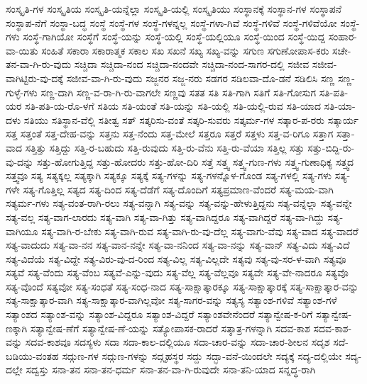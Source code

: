 {ಸಂಸ್ಕೃತಿ-ಗಳ
ಸಂಸ್ಕೃತಿಯ
ಸಂಸ್ಕೃತಿ-ಯನ್ನೆಲ್ಲಾ
ಸಂಸ್ಕೃತಿ-ಯಲ್ಲಿ
ಸಂಸ್ಕೃತಿಯು
ಸಂಸ್ಥಾನಕ್ಕೆ
ಸಂಸ್ಥಾನ-ಗಳ
ಸಂಸ್ಥಾಪನೆ
ಸಂಸ್ಥಾಪ-ನೆಗೆ
ಸಂಸ್ಥಾ-ಬದ್ಧ
ಸಂಸ್ಥೆ
ಸಂಸ್ಥೆ-ಗಳ
ಸಂಸ್ಥೆ-ಗಳನ್ನಲ್ಲ
ಸಂಸ್ಥೆ-ಗಳಾ-ಗಿವೆ
ಸಂಸ್ಥೆ-ಗಳಿವೆ
ಸಂಸ್ಥೆ-ಗಳಿವೆಯೋ
ಸಂಸ್ಥೆ-ಗಳು
ಸಂಸ್ಥೆ-ಗಾಗಿಯೋ
ಸಂಸ್ಥೆಗೆ
ಸಂಸ್ಥೆ-ಯನ್ನು
ಸಂಸ್ಥೆ-ಯಲ್ಲಿ
ಸಂಸ್ಥೆ-ಯಲ್ಲಿಯೂ
ಸಂಸ್ಥೆ-ಯಿಂದ
ಸಂಸ್ಥೆ-ಯಿದ್ದ
ಸಂಹಾರ-ವಾ-ಯಿತು
ಸಂಹಿತೆ
ಸಕಾರಾ
ಸಕಾರಾತ್ಮಕ
ಸಕಾಲ
ಸಖ
ಸಖನೆ
ಸಖ್ಯ
ಸಖ್ಯ-ವನ್ನು
ಸಗುಣ
ಸಗುಣೋಪಾಸ-ಕರು
ಸಚೇ-ತನ-ವಾ-ಗಿ-ರು-ವುದು
ಸಚ್ಚಿದಾ
ಸಚ್ಚಿದಾ-ನಂದ
ಸಚ್ಚಿದಾ-ನಂದವೇ
ಸಚ್ಚಿದಾ-ನಂದ-ಸಾಗರ-ದಲ್ಲಿ
ಸಜೀವ
ಸಜೀವ-ವಾಗಿಟ್ಟಿರು-ವು-ದಕ್ಕೆ
ಸಜೀವ-ವಾ-ಗಿ-ರು-ವುದು
ಸಜ್ಜನರ
ಸಜ್ಜ-ನರು
ಸಡಗರ
ಸಡಿಲವಾ-ದೊ-ಡನೆ
ಸಡಿಲಿಸಿ
ಸಣ್ಣ
ಸಣ್ಣ-ಗುಳ್ಳೆ-ಗಳು
ಸಣ್ಣ-ದಾಗಿ
ಸಣ್ಣ-ವ-ರಾ-ಗಿ-ರು-ವಾಗಲೇ
ಸಣ್ಣವು
ಸತತ
ಸತಿ
ಸತಿ-ಗಾಗಿ
ಸತಿಗೆ
ಸತಿ-ಗೋಸುಗ
ಸತಿ-ಪತಿ-ಯರ
ಸತಿ-ಪತಿ-ಯ-ರೊ-ಳಗೆ
ಸತಿಯ
ಸತಿ-ಯಂತೆ
ಸತಿ-ಯನ್ನು
ಸತಿ-ಯಲ್ಲಿ
ಸತಿ-ಯಲ್ಲಿ-ರುವ
ಸತಿ-ಯಾದ
ಸತಿ-ಯಾ-ದಳು
ಸತಿಯು
ಸತಿಸ್ಥಾನ-ವೆಲ್ಲಿ
ಸತೀತ್ವ
ಸತ್
ಸತ್ಕರಿಸು-ವಂತೆ
ಸತ್ಕರಿ-ಸುವರು
ಸತ್ಕರ್ಮ-ಗಳ
ಸತ್ಕಾರ-ಪ-ರರು
ಸತ್ಕಾರ್ಯ
ಸತ್ತ
ಸತ್ತಂತೆ
ಸತ್ತ-ದೇಹ-ವನ್ನು
ಸತ್ತನು
ಸತ್ತ-ನೆಂದು
ಸತ್ತ-ಮೇಲೆ
ಸತ್ತರೂ
ಸತ್ತರೆ
ಸತ್ತಳು
ಸತ್ತ-ವ-ರಿಗೂ
ಸತ್ತಾಗ
ಸತ್ತಾ-ವಾದ
ಸತ್ತಿತ್ತು
ಸತ್ತಿದ್ದು
ಸತ್ತಿ-ರ-ಬಹುದು
ಸತ್ತಿ-ರುವುದು
ಸತ್ತಿ-ರು-ವೆನು
ಸತ್ತಿ-ರು-ವೆಯಾ
ಸತ್ತಿಲ್ಲ
ಸತ್ತು
ಸತ್ತು-ಬಿದ್ದಿ-ರು-ವು-ದನ್ನು
ಸತ್ತು-ಹೋಗುತ್ತಿದ್ದ
ಸತ್ತು-ಹೋದರು
ಸತ್ತು-ಹೋ-ದಿರಿ
ಸತ್ತೆ
ಸತ್ತ್ವ
ಸತ್ತ್ವ-ಗುಣ-ಗಳು
ಸತ್ತ್ವ-ಗುಣಾಧಿಕ್ಯ
ಸತ್ತ್ವದ
ಸತ್ತ್ವವೂ
ಸತ್ಯ
ಸತ್ಯಕ್ಕಲ್ಲ
ಸತ್ಯಕ್ಕಾಗಿ
ಸತ್ಯಕ್ಕೂ
ಸತ್ಯಕ್ಕೆ
ಸತ್ಯ-ಗಳನ್ನು
ಸತ್ಯ-ಗಳನ್ನೊಳ-ಗೊಂಡ
ಸತ್ಯ-ಗಳಲ್ಲಿ
ಸತ್ಯ-ಗಳು
ಸತ್ಯ-ಗಳೇ
ಸತ್ಯ-ಗೊತ್ತಿಲ್ಲ
ಸತ್ಯದ
ಸತ್ಯ-ದಿಂದ
ಸತ್ಯ-ದೆಡೆಗೆ
ಸತ್ಯ-ದೊಂದಿಗೆ
ಸತ್ಯಪ್ರಮಾಣ-ವೆಂದರೆ
ಸತ್ಯ-ಮಯ-ವಾಗಿ
ಸತ್ಯರ್ಮ-ಗಳು
ಸತ್ಯ-ವಂತ-ರಾಗಿ-ರಲು
ಸತ್ಯ-ವನ್ನಾಗಿ
ಸತ್ಯ-ವನ್ನು
ಸತ್ಯ-ವನ್ನು-ಹೇಳುತ್ತಿದ್ದನು
ಸತ್ಯ-ವನ್ನೆಲ್ಲಾ
ಸತ್ಯ-ವನ್ನೇ
ಸತ್ಯ-ವಲ್ಲ
ಸತ್ಯ-ವಾಗ-ಲಾರದು
ಸತ್ಯ-ವಾಗಿ
ಸತ್ಯ-ವಾ-ಗಿತ್ತು
ಸತ್ಯ-ವಾಗಿದ್ದರೂ
ಸತ್ಯ-ವಾಗಿದ್ದರೆ
ಸತ್ಯ-ವಾ-ಗಿದ್ದು
ಸತ್ಯ-ವಾಗಿಯೂ
ಸತ್ಯ-ವಾಗಿ-ರ-ಬೇಕು
ಸತ್ಯ-ವಾಗಿ-ರುವ
ಸತ್ಯ-ವಾಗಿ-ರು-ವು-ದೆಲ್ಲ
ಸತ್ಯ-ವಾಗು-ವೆವು
ಸತ್ಯ-ವಾದ
ಸತ್ಯ-ವಾದರೆ
ಸತ್ಯ-ವಾದುದು
ಸತ್ಯ-ವಾ-ನನ
ಸತ್ಯ-ವಾನ-ನನ್ನೇ
ಸತ್ಯ-ವಾ-ನನಿಂದ
ಸತ್ಯ-ವಾ-ನನ್ನು
ಸತ್ಯ-ವಾನ್
ಸತ್ಯ-ವಿದು
ಸತ್ಯ-ವಿದೆ
ಸತ್ಯ-ವಿದೆಯೆ
ಸತ್ಯ-ವಿದ್ದೇ
ಸತ್ಯ-ವಿರು-ವು-ದ-ರಿಂದ
ಸತ್ಯ-ವಿಲ್ಲ
ಸತ್ಯ-ವಿಲ್ಲದೇ
ಸತ್ಯವು
ಸತ್ಯ-ವು-ಸರ-ಳ-ವಾಗಿ
ಸತ್ಯವೂ
ಸತ್ಯವೆ
ಸತ್ಯ-ವೆಂದು
ಸತ್ಯ-ವೆಂಬ
ಸತ್ಯವೆ-ಎನ್ನು-ವುದು
ಸತ್ಯ-ವೆಲ್ಲ
ಸತ್ಯ-ವೆಲ್ಲವೂ
ಸತ್ಯವೇ
ಸತ್ಯ-ವೇ-ನಾದರೂ
ಸತ್ಯವೊ
ಸತ್ಯ-ವೊಂದೆ
ಸತ್ಯವೋ
ಸತ್ಯ-ಸಂಧತೆ
ಸತ್ಯ-ಸಂಧ-ನಾದ
ಸತ್ಯ-ಸಾಕ್ಷಾತ್ಕಾರಕ್ಕೂ
ಸತ್ಯ-ಸಾಕ್ಷಾತ್ಕಾರಕ್ಕೆ
ಸತ್ಯ-ಸಾಕ್ಷಾತ್ಕಾರ-ವನ್ನು
ಸತ್ಯ-ಸಾಕ್ಷಾತ್ಕಾರ-ವಾಗಿ
ಸತ್ಯ-ಸಾಕ್ಷಾತ್ಕಾರ-ವಾಗಿಲ್ಲವೋ
ಸತ್ಯ-ಸಾಗರ-ವನ್ನು
ಸತ್ಯಸ್ಯ
ಸತ್ಯಾಂಶ-ಗಳಿವೆ
ಸತ್ಯಾಂಶ-ಗಳೆ
ಸತ್ಯಾಂಶದ
ಸತ್ಯಾಂಶ-ವನ್ನು
ಸತ್ಯಾಂಶ-ವಿದ್ದರೂ
ಸತ್ಯಾಂಶ-ವಿದ್ದರೆ
ಸತ್ಯಾಂಶವೇನೆಂದರೆ
ಸತ್ಯಾನ್ವೇಷ-ಕ-ರಿಗೆ
ಸತ್ಯಾನ್ವೇಷ-ಣಕ್ಕಾಗಿ
ಸತ್ಯಾನ್ವೇಷ-ಣೆಗೆ
ಸತ್ಯಾನ್ವೇಷ-ಣೆ-ಯನ್ನು
ಸತ್ಯೋಪಾಸಕ-ರಾದರೆ
ಸತ್ಶಾತ್ರ-ಗಳನ್ನಾಗಿ
ಸದವ-ಕಾಶ
ಸದವ-ಕಾಶ-ವನ್ನು
ಸದವ-ಕಾಶವೂ
ಸದಸ್ಯಳು
ಸದಾ
ಸದಾ-ಕಾಲ-ದಲ್ಲಿಯೂ
ಸದಾ-ಚಾರ-ವನ್ನು
ಸದಾ-ಚಾರ-ಶೀಲನ
ಸದೃಶ
ಸದೆ-ಬಡಿಯು-ವಂತಹ
ಸದ್ಗುಣ-ಗಳ
ಸದ್ಗುಣ-ಗಳನ್ನು
ಸದ್ಗೃಹಸ್ಥರ
ಸದ್ದು
ಸದ್ಭಾ-ವನೆ-ಯಿಂದಲೇ
ಸದ್ಯಕ್ಕೆ
ಸದ್ಯ-ದಲ್ಲಿಯೇ
ಸದ್ಯ-ದಲ್ಲೇ
ಸದ್ವಸ್ತು
ಸನಾ-ತನ
ಸನಾ-ತನ-ಧರ್ಮ
ಸನಾ-ತನ-ವಾ-ಗಿ-ರುವುದೇ
ಸನಾ-ತನಿ-ಯಾದ
ಸನ್ನದ್ಧ-ರಾಗಿ
}
